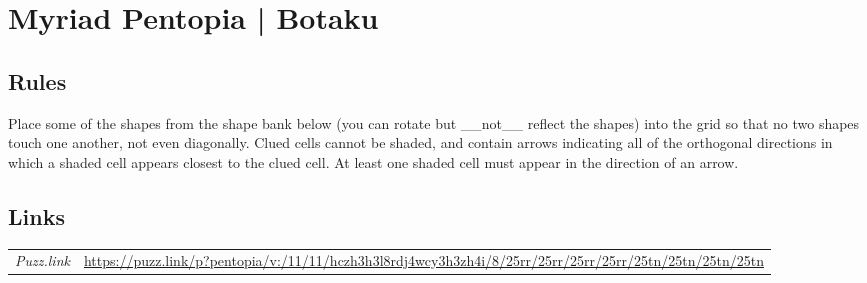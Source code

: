 \section{Myriad Pentopia | {\normalfont Botaku}}
\label{sec:42-myriad-pentopia-botaku}

\subsection*{Rules}
\begin{markdown}
Place some of the shapes from the shape bank below (you can rotate but __not__ reflect the shapes) into the grid so that no two shapes touch one another, not even diagonally. Clued cells cannot be shaded, and contain arrows indicating all of the orthogonal directions in which a shaded cell appears closest to the clued cell. At least one shaded cell must appear in the direction of an arrow.
\end{markdown}
\subsection*{Links}
\begin{tabularx}{\textwidth}{l X}
\emph{Puzz.link} & \url{https://puzz.link/p?pentopia/v:/11/11/hczh3h3l8rdj4wcy3h3zh4i/8/25rr/25rr/25rr/25rr/25tn/25tn/25tn/25tn} \\
\end{tabularx}
\pagebreak
